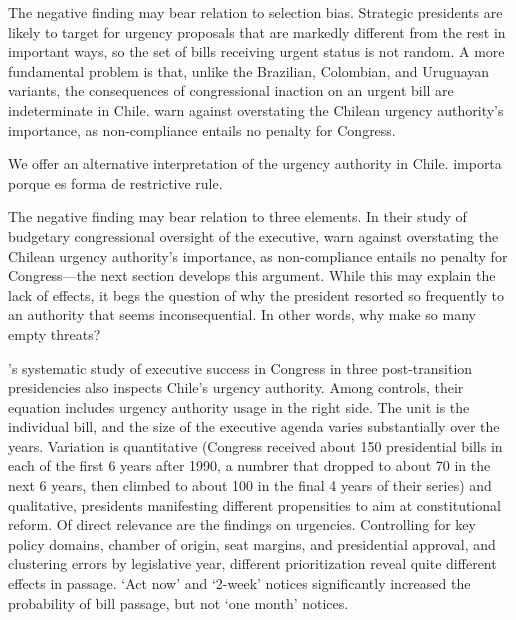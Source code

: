 The negative finding may bear relation to selection bias. Strategic presidents are likely to target for urgency proposals that are markedly different from the rest in important ways, so the set of bills receiving urgent status is not random. A more fundamental problem is that, unlike the Brazilian, Colombian, and Uruguayan variants, the consequences of congressional inaction on an urgent bill are indeterminate in Chile. \citet{berrios.gamboa.fiscChile.2006} warn against overstating the Chilean urgency authority's importance, as non-compliance entails no penalty for Congress. 

We offer an alternative interpretation of the urgency authority in Chile. importa porque es forma de restrictive rule. 









The negative finding may bear relation to three elements. In their study of budgetary congressional oversight of the executive, \citet{berrios.gamboa.fiscChile.2006} warn against overstating the Chilean urgency authority's importance, as non-compliance entails no penalty for Congress---the next section develops this argument. While this may explain the lack of effects, it begs the question of why the president resorted so frequently to an authority that seems inconsequential. In other words, why make so many empty threats?


\citeauthor{aleman.navia.UrgChi.2009}'s \citeyearpar{aleman.navia.UrgChi.2009} systematic study of executive success in Congress in three post-transition presidencies also inspects Chile's urgency authority. Among controls, their equation includes urgency authority usage in the right side. The unit is the individual bill, and the size of the executive agenda varies substantially over the years. Variation is quantitative  (Congress received about 150 presidential bills in each of the first 6 years after 1990, a numbrer that dropped to about 70 in the next 6 years, then climbed to about 100 in the final 4 years of their series) and qualitative, presidents manifesting different propensities to aim at constitutional reform. Of direct relevance are the findings on urgencies. Controlling for key policy domains, chamber of origin, seat margins, and presidential approval, and clustering errors by legislative year, different prioritization reveal quite different effects in passage. `Act now' and `2-week' notices significantly increased the probability of bill passage, but not `one month' notices. 

